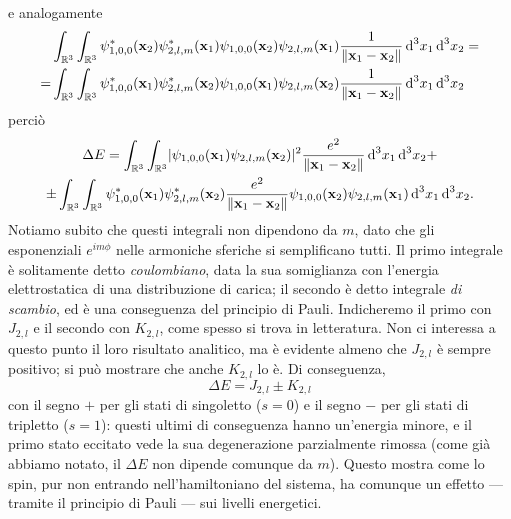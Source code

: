 e analogamente
\begin{equation}
    \begin{aligned}
        &\int_{\mathbb{R}^3}\int_{\mathbb{R}^3}
            \psi_{1,0,0}^*(\mathbf{x}_2)\psi_{2,l,m}^*(\mathbf{x}_1)\psi_{1,0,0}(\mathbf{x}_2)\psi_{2,l,m}(\mathbf{x}_1)
            \frac1{\lVert\mathbf{x}_1-\mathbf{x}_2\rVert}
        \,\textup{d}^3 x_1\,\textup{d}^3 x_2=\\
        =&\int_{\mathbb{R}^3}\int_{\mathbb{R}^3}
            \psi_{1,0,0}^*(\mathbf{x}_1)\psi_{2,l,m}^*(\mathbf{x}_2)\psi_{1,0,0}(\mathbf{x}_1)\psi_{2,l,m}(\mathbf{x}_2)
            \frac1{\lVert\mathbf{x}_1-\mathbf{x}_2\rVert}
        \,\textup{d}^3 x_1\,\textup{d}^3 x_2
    \end{aligned}
\end{equation}
perciò
\begin{multline}
    \Delta E=
    \int_{\mathbb{R}^3}\int_{\mathbb{R}^3}
        \lvert\psi_{1,0,0}(\mathbf{x}_1)\psi_{2,l,m}(\mathbf{x}_2)\rvert^2
        \frac{e^2}{\lVert\mathbf{x}_1-\mathbf{x}_2\rVert}
    \,\textup{d}^3 x_1\,\textup{d}^3 x_2
    + \\ \pm
    \int_{\mathbb{R}^3}\int_{\mathbb{R}^3}
        \psi_{1,0,0}^*(\mathbf{x}_1)\psi_{2,l,m}^*(\mathbf{x}_2)
        \frac{e^2}{\lVert\mathbf{x}_1-\mathbf{x}_2\rVert}
        \psi_{1,0,0}(\mathbf{x}_2)\psi_{2,l,m}(\mathbf{x}_1)
    \,\textup{d}^3 x_1\,\textup{d}^3 x_2.
\end{multline}
Notiamo subito che questi integrali non dipendono da $m$, dato che gli esponenziali $e^{im\phi}$ nelle armoniche sferiche si semplificano tutti.
Il primo integrale è solitamente detto \emph{coulombiano}, data la sua somiglianza con l'energia elettrostatica di una distribuzione di carica; il secondo è detto integrale \emph{di scambio}, ed è una conseguenza del principio di Pauli.
Indicheremo il primo con $J_{2,l}$ e il secondo con $K_{2,l}$, come spesso si trova in letteratura.
Non ci interessa a questo punto il loro risultato analitico, ma è evidente almeno che $J_{2,l}$ è sempre positivo; si può mostrare che anche $K_{2,l}$ lo è.
Di conseguenza,
\begin{equation}
    \Delta E=J_{2,l}\pm K_{2,l}
\end{equation}
con il segno $+$ per gli stati di singoletto ($s=0$) e il segno $-$ per gli stati di tripletto ($s=1$): questi ultimi di conseguenza hanno un'energia minore, e il primo stato eccitato vede la sua degenerazione parzialmente rimossa (come già abbiamo notato, il $\Delta E$ non dipende comunque da $m$).
Questo mostra come lo spin, pur non entrando nell'hamiltoniano del sistema, ha comunque un effetto --- tramite il principio di Pauli --- sui livelli energetici.
